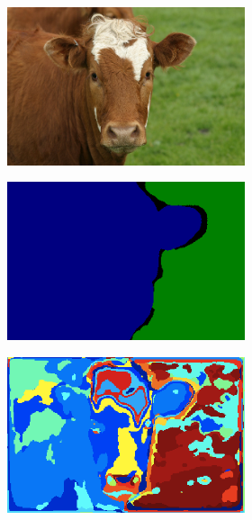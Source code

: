 \documentclass{article} %
\begin{document}
\begin{figure}
	\centering
	\begin{subfigure}[c]{\textwidth}
		\centering
		\begin{subfigure}[c]{0.195\textwidth}
			\includegraphics[width = \textwidth]{./img/1_22_s.png}
			\label{fig:1_22_s}
		\end{subfigure}
		\begin{subfigure}[c]{0.195\textwidth}
			\includegraphics[width = \textwidth]{./img/1_22_s_GT.png}
			\label{fig:1_22_s_lab}
		\end{subfigure}
		\begin{subfigure}[c]{0.195\textwidth}
			\includegraphics[width = \textwidth]{./img/1_22_s_map.png}

\end{subfigure}
\end{subfigure}
\end{figure}
\end{document}
